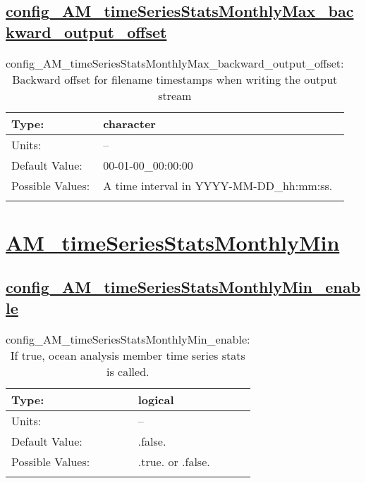 \subsection[config\_AM\_timeSeriesStatsMonthlyMax\_backward\_output\_offset]{\hyperref[sec:nm_tab_AM_timeSeriesStatsMonthlyMax]{config\_AM\_timeSeriesStatsMonthlyMax\_backward\_output\_offset}}
\label{subsec:nm_sec_config_AM_timeSeriesStatsMonthlyMax_backward_output_offset}
\begin{center}
\begin{longtable}{| p{2.0in} || p{4.0in} |}
    \hline
    Type: & character \\
    \hline
    Units: & -- \\
    \hline
    Default Value: & 00-01-00\_00:00:00 \\
    \hline
    Possible Values: & A time interval in YYYY-MM-DD\_hh:mm:ss. \\
    \hline
    \caption{config\_AM\_timeSeriesStatsMonthlyMax\_backward\_output\_offset: Backward offset for filename timestamps when writing the output stream}
\end{longtable}
\end{center}
\section[AM\_timeSeriesStatsMonthlyMin]{\hyperref[sec:nm_tab_AM_timeSeriesStatsMonthlyMin]{AM\_timeSeriesStatsMonthlyMin}}
\label{sec:nm_sec_AM_timeSeriesStatsMonthlyMin}
\subsection[config\_AM\_timeSeriesStatsMonthlyMin\_enable]{\hyperref[sec:nm_tab_AM_timeSeriesStatsMonthlyMin]{config\_AM\_timeSeriesStatsMonthlyMin\_enable}}
\label{subsec:nm_sec_config_AM_timeSeriesStatsMonthlyMin_enable}
\begin{center}
\begin{longtable}{| p{2.0in} || p{4.0in} |}
    \hline
    Type: & logical \\
    \hline
    Units: & -- \\
    \hline
    Default Value: & .false. \\
    \hline
    Possible Values: & .true. or .false. \\
    \hline
    \caption{config\_AM\_timeSeriesStatsMonthlyMin\_enable: If true, ocean analysis member time series stats is called.}
\end{longtable}
\end{center}
